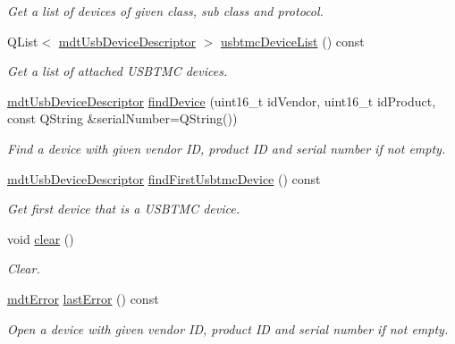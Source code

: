\begin{DoxyCompactItemize}
\begin{DoxyCompactList}\small\item\em Get a list of devices of given class, sub class and protocol. \end{DoxyCompactList}\item 
Q\-List$<$ \hyperlink{classmdt_usb_device_descriptor}{mdt\-Usb\-Device\-Descriptor} $>$ \hyperlink{classmdt_usb_device_list_a08a5882459612c1a95f891c315528b5c}{usbtmc\-Device\-List} () const 
\begin{DoxyCompactList}\small\item\em Get a list of attached U\-S\-B\-T\-M\-C devices. \end{DoxyCompactList}\item 
\hyperlink{classmdt_usb_device_descriptor}{mdt\-Usb\-Device\-Descriptor} \hyperlink{classmdt_usb_device_list_aba706f1ab782e5d25f331d2d6946023c}{find\-Device} (uint16\-\_\-t id\-Vendor, uint16\-\_\-t id\-Product, const Q\-String \&serial\-Number=Q\-String())
\begin{DoxyCompactList}\small\item\em Find a device with given vendor I\-D, product I\-D and serial number if not empty. \end{DoxyCompactList}\item 
\hyperlink{classmdt_usb_device_descriptor}{mdt\-Usb\-Device\-Descriptor} \hyperlink{classmdt_usb_device_list_abf867860c60d24cd8b62c10771af75d8}{find\-First\-Usbtmc\-Device} () const 
\begin{DoxyCompactList}\small\item\em Get first device that is a U\-S\-B\-T\-M\-C device. \end{DoxyCompactList}\item 
void \hyperlink{classmdt_usb_device_list_afed0b1d9e51beca0bf45e5ca03f81896}{clear} ()
\begin{DoxyCompactList}\small\item\em Clear. \end{DoxyCompactList}\item 
\hyperlink{classmdt_error}{mdt\-Error} \hyperlink{classmdt_usb_device_list_af4fa249c48fe4f1c51cd3cd4d82979cb}{last\-Error} () const 
\begin{DoxyCompactList}\small\item\em Open a device with given vendor I\-D, product I\-D and serial number if not empty. \end{DoxyCompactList}\end{DoxyCompactItemize}


